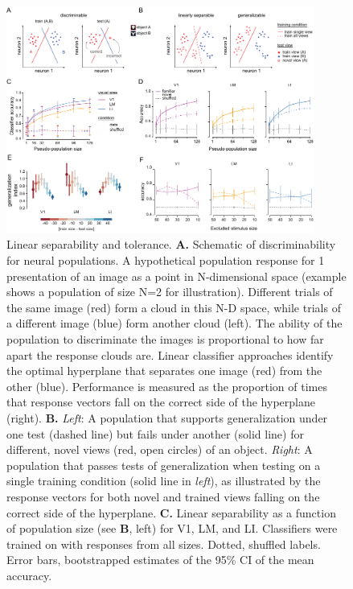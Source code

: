 \begin{figure}[t!]
    \includegraphics[width=0.9\textwidth]{figures/chapter_4/fig_4-4_neural_generalization/fig_4-4_neural_generalization.pdf}
    \centering
    \caption[Population representations of objects]{Linear separability and tolerance. 
    \textbf{A.} Schematic of discriminability for neural populations. A hypothetical population response for 1 presentation of an image as a point in N-dimensional space (example shows a population of size N=2 for illustration). Different trials of the same image (red) form a cloud in this N-D space, while trials of a different image (blue) form another cloud (left). The ability of the population to discriminate the images is proportional to how far apart the response clouds are. Linear classifier approaches identify the optimal hyperplane that separates one image (red) from the other (blue). Performance is measured as the proportion of times that response vectors fall on the correct side of the hyperplane (right). 
    \textbf{B.} \textit{Left}: A population that supports generalization under one test (dashed line) but fails under another (solid line) for different, novel views (red, open circles) of an object. \textit{Right}: A population that passes tests of generalization when testing on a single training condition (solid line in \textit{left}), as illustrated by the response vectors for both novel and trained views falling on the correct side of the hyperplane.
    \textbf{C.} Linear separability as a function of population size (see \textbf{B}, left) for V1, LM, and LI. Classifiers were trained on with responses from all sizes. Dotted, shuffled labels. Error bars, bootstrapped estimates of the 95\% CI of the mean accuracy. 
}
\end{figure}
